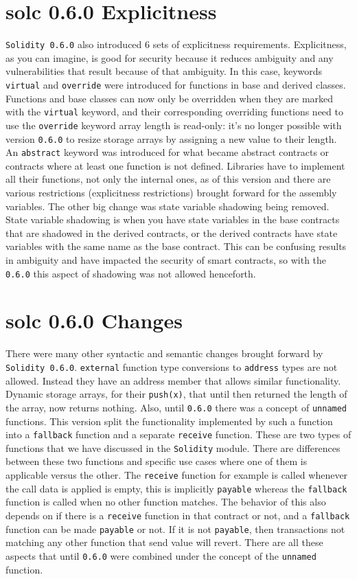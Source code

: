 \section{solc 0.6.0 Explicitness}
\verb|Solidity 0.6.0| also introduced 6 sets of explicitness requirements. Explicitness, as you can imagine, is good for security because it reduces ambiguity and any vulnerabilities that result because of that ambiguity. In this case, keywords \verb|virtual| and \verb|override| were introduced for functions in base and derived classes. Functions and base classes can now only be overridden when they are marked with the \verb|virtual| keyword, and their corresponding overriding functions need to use the \verb|override| keyword array length is read-only: it's no longer possible with version \verb|0.6.0| to resize storage arrays by assigning a new value to their length. An \verb|abstract| keyword was introduced for what became abstract contracts or contracts where at least one function is not defined. Libraries have to implement all their functions, not only the internal ones, as of this version and there are various restrictions (explicitness restrictions) brought forward for the assembly variables. The other big change was state variable shadowing being removed. State variable shadowing is when you have state variables in the base contracts that are shadowed in the derived contracts, or the derived contracts have state variables with the same name as the base contract. This can be confusing results in ambiguity and have impacted the security of smart contracts, so with the \verb|0.6.0| this aspect of shadowing was not allowed henceforth.

\section{solc 0.6.0 Changes}
There were many other syntactic and semantic changes brought forward by \verb|Solidity 0.6.0|. \verb|external| function type conversions to \verb|address| types are not allowed. Instead they have an address member that allows similar functionality. Dynamic storage arrays, for their \verb|push(x)|, that until then returned the length of the array, now returns nothing. Also, until \verb|0.6.0| there was a concept of \verb|unnamed| functions. This version split the functionality implemented by such a function into a \verb|fallback| function and a separate \verb|receive| function. These are two types of functions that we have discussed in the \verb|Solidity| module. There are differences between these two functions and specific use cases where one of them is applicable versus the other. The \verb|receive| function for example is called whenever the call data is applied is empty, this is implicitly \verb|payable| whereas the \verb|fallback| function is called when no other function matches. The behavior of this also depends on if there is a \verb|receive| function in that contract or not, and a \verb|fallback| function can be made \verb|payable| or not. If it is not \verb|payable|, then transactions not matching any other function that send value will revert. There are all these aspects that until \verb|0.6.0| were combined under the concept of the \verb|unnamed| function.

